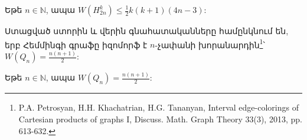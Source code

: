 \begin{hide}
\begin{corollary}
\label{c2_Hamming_balanced_upper} Եթե $n \in \mathbb{N}$, ապա 
$W(H_{2n}^k) \leq \frac{1}{2}k(k+1)(4n-3)$:
\end{corollary}
\end{hide}

Ստացված ստորին և վերին գնահատականները համընկնում են, երբ Հեմմինգի գրաֆը իզոմորֆ է $n$-չափանի խորանարդին\footnote{P.A. Petrosyan, H.H. Khachatrian, H.G. Tananyan, Interval edge-colorings of Cartesian products of graphs I, Discuss. Math. Graph Theory 33(3), 2013, pp. 613-632.}՝ $W\left(Q_{n}\right) = \frac{n(n+1)}{2}$:

\begin{hide}

\begin{corollary}\cite{PetrosyanKhachatrianTananyan2011,PetrosyanKhachatrianTananyan2013}
\label{c2_n_cube} Եթե $n\in\mathbb{N}$, ապա $W\left(Q_{n}\right) = \frac{n(n+1)}{2}$:
\end{corollary}

\end{hide}